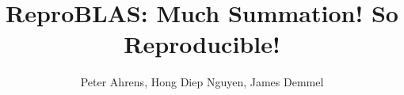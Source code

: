 \documentclass[12pt]{article}
\author{Peter Ahrens, Hong Diep Nguyen, James Demmel}
\title{ReproBLAS: Much Summation! So Reproducible!}
\theoremstyle{definition}
\numberwithin{equation}{section}
\numberwithin{figure}{section}
\begin{document}
\noindent
\maketitle
\tableofcontents
\newpage













\end{document}
